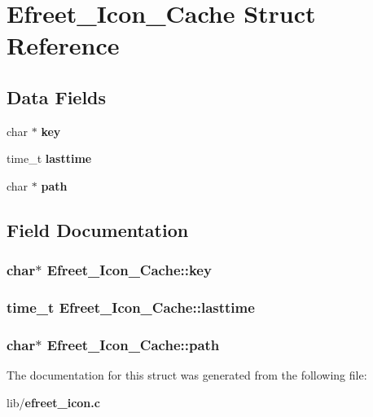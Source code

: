 \section{Efreet\_\-Icon\_\-Cache Struct Reference}
\label{structEfreet__Icon__Cache}
\subsection*{Data Fields}
\begin{CompactItemize}
\item 
char $\ast$ {\bf key}
\item 
time\_\-t {\bf lasttime}
\item 
char $\ast$ {\bf path}
\end{CompactItemize}


\subsection{Field Documentation}
\subsubsection[key]{\setlength{\rightskip}{0pt plus 5cm}char$\ast$ {\bf Efreet\_\-Icon\_\-Cache::key}}\label{structEfreet__Icon__Cache_3af3581234cc81c8df0814ba97da8b07}


\subsubsection[lasttime]{\setlength{\rightskip}{0pt plus 5cm}time\_\-t {\bf Efreet\_\-Icon\_\-Cache::lasttime}}\label{structEfreet__Icon__Cache_021f8e16b27a63bbce0f9167305832f7}


\subsubsection[path]{\setlength{\rightskip}{0pt plus 5cm}char$\ast$ {\bf Efreet\_\-Icon\_\-Cache::path}}\label{structEfreet__Icon__Cache_347ba910de6ba9a95cda8d1b1d7bb583}




The documentation for this struct was generated from the following file:\begin{CompactItemize}
\item 
lib/{\bf efreet\_\-icon.c}\end{CompactItemize}
